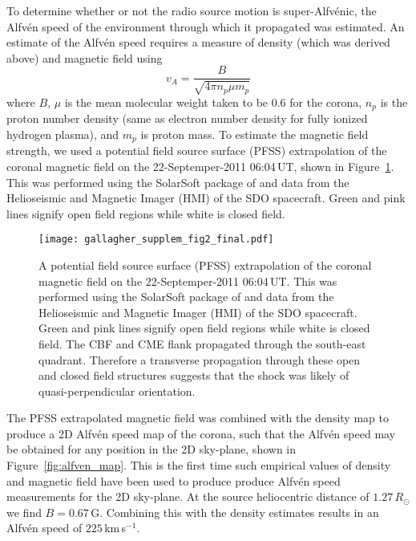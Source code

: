 To determine whether or not the radio source motion is super-Alfv\'{e}nic, the Alfv\'{e}n speed of the environment through which it propagated was estimated. An estimate of the Alfv\'{e}n speed requires a measure of density (which was derived above) and magnetic field using 
\begin{equation}
v_A = \frac{B}{\sqrt{4\pi n_p \mu m_p}}
\end{equation}
where $B$, $\mu$ is the mean molecular weight taken to be 0.6 for the corona, $n_p$ is the proton number density (same as electron number density for fully ionized hydrogen plasma), and $m_p$ is proton mass. To estimate the magnetic field strength, we used a potential field source surface (PFSS) extrapolation of the coronal magnetic field on the 22-Septemper-2011 06:04\,UT, shown in Figure~\ref{fig:pfss}. 
This was performed using the SolarSoft package of \citet{schrijver2003} and data from the Helioseismic and Magnetic Imager (HMI)\citep{scherrer2012} of the SDO spacecraft. Green and pink lines signify open field regions while white is closed field.
\begin{figure}[t!]
\begin{center}
\texttt{[image: gallagher\_supplem\_fig2\_final.pdf]}
\caption[A potential field source surface extrapolation of the corona magnetic field]{A potential field source surface (PFSS) extrapolation of the coronal magnetic field on the 22-Septemper-2011 06:04\,UT. This was performed using the SolarSoft package of \citet{schrijver2003} and data from the Helioseismic and Magnetic Imager (HMI)\citep{scherrer2012} of the SDO spacecraft. Green and pink lines signify open field regions while white is closed field. The CBF and CME flank propagated through the south-east quadrant. Therefore a transverse propagation through these open and closed field structures suggests that the shock was likely of quasi-perpendicular orientation.}
\label{fig:pfss}
\end{center}
\end{figure}
The PFSS extrapolated magnetic field was combined with the density map to produce a 2D Alfv\'{e}n speed map of the corona, such that the Alfv\'{e}n speed may be obtained for any position in the 2D sky-plane, shown in Figure~\ref{fig:alfven_map}. This is the first time such empirical values of density and magnetic field have been used to produce produce Alfv\'{e}n speed measurements for the 2D sky-plane. 
At the source heliocentric distance of $1.27\,R_{\odot}$ we find $B=0.67$\,G. Combining this with the density estimates results in an Alfv\'{e}n speed of $225$\,km\,s$^{-1}$. 
